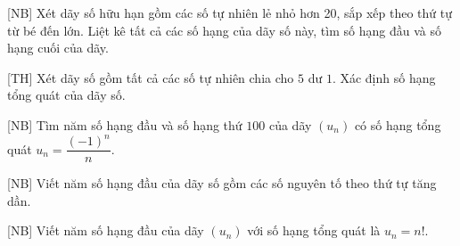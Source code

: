 \begin{bt}%
[NB]%
	Xét dãy số hữu hạn gồm các số tự nhiên lẻ nhỏ hơn 20, sắp xếp theo thứ tự từ bé đến lớn. Liệt kê tất cả các số hạng của dãy số này, tìm số hạng đầu và số hạng cuối của dãy. 
\end{bt}

\begin{bt}%
[TH]%
	Xét dãy số gồm tất cả các số tự nhiên chia cho $5$ dư $1$. Xác định số hạng tổng quát của dãy số.
\end{bt}

\begin{bt}%
[NB]%
	Tìm năm số hạng đầu và số hạng thứ $100$ của dãy $(u_n)$ có số hạng tổng quát $u_n= \dfrac{(-1)^n}{n}$.
\end{bt}

\begin{bt}%
[NB]%
	Viết năm số hạng đầu của dãy số gồm các số nguyên tố theo thứ tự tăng dần.
\end{bt}

\begin{bt}%
[NB]%
	Viết năm số hạng đầu của dãy $(u_n)$ với số hạng tổng quát là $u_n=n!$.
\end{bt}

